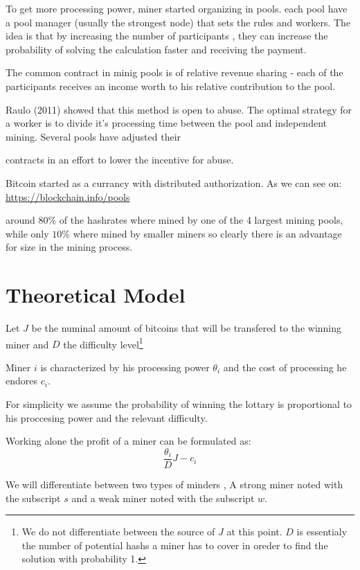 \documentclass{article}
\begin{document}
 To get more processing power, miner started organizing in pools. each pool have a pool manager (usually the strongest node) that sets the rules and workers. The idea is that by increasing the number of participants , they can increase the probability of solving the calculation faster and receiving the payment.

 The common contract in minig pools is of relative revenue sharing - each of the participants receives an income worth to his relative contribution to the pool. 

 Raulo (2011) showed that this method is open to abuse. The optimal strategy for a worker is to divide it's processing time between the pool and independent mining. Several pools have adjusted their

 contracts in an effort to lower the incentive for abuse.


Bitcoin started as a currancy with distributed authorization. As we can see on:\\
\href{https://blockchain.info/pools}{https://blockchain.info/pools}

around $80\%$ of the hashrates where mined by one of the 4 largest mining pools, while only $10\%$ where mined by smaller miners so clearly there is an advantage for size in the mining process. 


\section{Theoretical Model}

Let $J$ be the numinal amount of bitcoins that will be transfered to the winning miner and $D$ the difficulty level\footnote{We do not differentiate between the source of $J$ at this point. $D$ is essentialy the number of potential hashs a miner has to cover in oreder to find the solution with probability 1. }

Miner $i$ is characterized by his processing power $\theta_{i}$ and the cost of processing he endores $c_{i}$.

For simplicity we assume the probability of winning the lottary is proportional to his proccesing power and the relevant difficulty.

Working alone the profit of a miner can be formulated as:
\begin{equation}\label{EQ:Profit_Work_Alone}
\frac{\theta_{i}}{D}J-c_{i}
\end{equation}

We will differentiate between two types of minders , A strong miner noted with the subscript $s$ and a weak miner noted with the subscript $w$.
\end{document}
